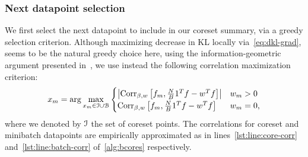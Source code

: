 \subsubsection{Next datapoint selection}
We first select the next datapoint to include in our coreset summary, via a greedy selection criterion. Although maximizing decrease in KL locally via~\cref{eq:dkl-grad}, seems to be the natural greedy choice here, using the information-geometric argument presented in~\cite{campbell19neurips}, we use instead the following correlation maximization criterion:
\[
x_{m} = \arg \underset{x_m \in \mathcal{I} \cup \mathcal{B} }{\max}
\begin{cases}
	\left|\operatorname{Corr}_{\beta,w}\left[f_m, \frac{N}{B}1^Tf - w^T f\right]\right| & w_m>0 \\
	\operatorname{Corr}_{\beta,w}\left[f_m, \frac{N}{B}1^Tf - w^T f\right] & w_m=0,
\end{cases}
\label{eq:greedy-select}
\]
where we denoted by $\mathcal{I}$ the set of coreset points.
The correlations for coreset and minibatch datapoints are empirically approximated  as in lines~\ref{lst:line:core-corr} and~\ref{lst:line:batch-corr} of~\cref{alg:bcores} respectively.
\begin{comment}
\[
\hcorr = \diag \left[ \frac{1}{S} \sum_{s=1}^{S} g_s g_s^T \right]^{-\frac{1}{2}} \left(\frac{1}{S} \sum_{s=1}^{S} g_s \left(\frac{N}{B}1^Tg_s- w^Tg_s\right) \right),
\label{eq:empirical-corr}
\]
where 
 \[
 g_s:= \begin{bmatrix}
		f_1(\theta_s) \\
		\vdots \\
		f_N(\theta_s)
\end{bmatrix}
-
\frac{1}{S}\sum_{r=1}^{S}
 \begin{bmatrix}
f_1(\theta_r) \\
\vdots \\
f_N(\theta_r)
\end{bmatrix}.
\label{eq:sampled-potentials}
\]
\end{comment}

